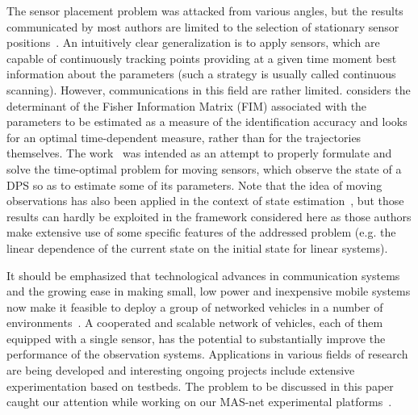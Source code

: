 The sensor placement problem was attacked from various angles, but the results communicated by most authors are limited to the selection of stationary sensor positions~\cite{Kubrusly1985, Ucinski2000, UcinskiOptDPS05}. An intuitively clear generalization is to apply sensors, which are capable of continuously tracking points providing at a given time moment best information about the parameters (such a strategy is usually called continuous scanning). However, communications in this field are rather limited. \cite{Rafajlowicz1986} considers the determinant of the Fisher Information Matrix (FIM) associated with the parameters to be estimated as a measure of the identification accuracy and looks for an optimal time-dependent measure, rather than for the trajectories themselves.
    The work~\cite{UcinskiTimeOpt2005} was intended as an attempt to properly formulate and solve the time-optimal problem for moving sensors, which observe the state of a DPS so as to estimate some of its parameters. Note that the idea of moving observations has also been applied in the context of state estimation~\cite{CarotenutoMobileSensorDPS, Khapalov1992, Nakano1981, Nakano1988}, but those results can hardly be exploited in the framework considered here as those authors make extensive use of some specific features of the addressed problem (e.g. the linear dependence of the current state on the initial state for linear systems).


It should be emphasized that technological advances in communication systems and the growing ease in making small, low power and inexpensive mobile systems now make it feasible to deploy a group of networked vehicles in a number of environments~\cite{CarotenutoMobileSensorDPS, ChongSensornet, MartinezBullo2006, OgrenCooperativeControl, SinopoliDist}. A cooperated and scalable network of vehicles, each of them equipped with a single sensor, has the potential to substantially improve the performance of the observation systems. Applications in various fields of research are being developed and interesting ongoing projects include extensive experimentation based on testbeds. The problem to be discussed in this paper caught our attention while working
on our MAS-net experimental platforms~\cite{MooreChen04,MASnetSPIE04ZoneControl,masnetspie04pathplan, ZhongminRobio04, PchenMS, AnishaMS}.


